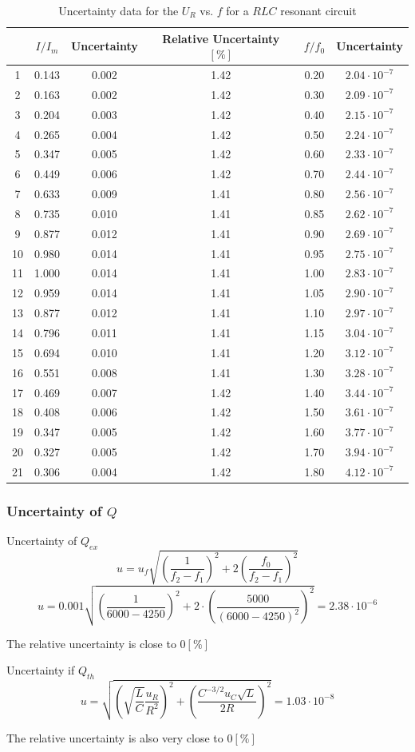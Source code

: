\documentclass[12pt]{article}
\begin{document}
\begin{table}[H]
\centering
\begin{tabular}{|c|c|c|c|c|c|}
\hline
   &$I/I_m$&Uncertainty&Relative Uncertainty $[\%]$&$f/f_0$&Uncertainty       \\ \hline
1  &0.143&0.002&1.42&0.20&$2.04\cdot10^{-7}$       \\ \hline
2  &0.163&0.002&1.42&0.30&$2.09\cdot10^{-7}$       \\ \hline
3  &0.204&0.003&1.42&0.40&$2.15\cdot10^{-7}$       \\ \hline
4  &0.265&0.004&1.42&0.50&$2.24\cdot10^{-7}$       \\ \hline
5  &0.347&0.005&1.42&0.60&$2.33\cdot10^{-7}$       \\ \hline
6  &0.449&0.006&1.42&0.70&$2.44\cdot10^{-7}$       \\ \hline
7  &0.633&0.009&1.41&0.80&$2.56\cdot10^{-7}$       \\ \hline
8  &0.735&0.010&1.41&0.85&$2.62\cdot10^{-7}$       \\ \hline
9  &0.877&0.012&1.41&0.90&$2.69\cdot10^{-7}$       \\ \hline
10 &0.980&0.014&1.41&0.95&$2.75\cdot10^{-7}$       \\ \hline
11 &1.000&0.014&1.41&1.00&$2.83\cdot10^{-7}$       \\ \hline
12 &0.959&0.014&1.41&1.05&$2.90\cdot10^{-7}$       \\ \hline
13 &0.877&0.012&1.41&1.10&$2.97\cdot10^{-7}$       \\ \hline
14 &0.796&0.011&1.41&1.15&$3.04\cdot10^{-7}$       \\ \hline
15 &0.694&0.010&1.41&1.20&$3.12\cdot10^{-7}$       \\ \hline
16 &0.551&0.008&1.41&1.30&$3.28\cdot10^{-7}$       \\ \hline
17 &0.469&0.007&1.42&1.40&$3.44\cdot10^{-7}$       \\ \hline
18 &0.408&0.006&1.42&1.50&$3.61\cdot10^{-7}$       \\ \hline
19 &0.347&0.005&1.42&1.60&$3.77\cdot10^{-7}$       \\ \hline
20 &0.327&0.005&1.42&1.70&$3.94\cdot10^{-7}$       \\ \hline
21 &0.306&0.004&1.42&1.80&$4.12\cdot10^{-7}$       \\ \hline
\end{tabular}
\caption{Uncertainty data for the $U_R$ vs. $f$ for a $RLC$ resonant circuit}
\end{table}
\subsubsection{Uncertainty of $Q$}
\par Uncertainty of $Q_{ex}$
$$u=u_f\sqrt{(\frac{1}{f_2-f_1})^2+2(\frac{f_0}{f_2-f_1})^2}$$
$$u=0.001\sqrt{(\frac{1}{6000-4250})^2+2\cdot(\frac{5000}{(6000-4250)^2})^2}=2.38\cdot10^{-6}$$
\par The relative uncertainty is close to $0[\%]$
\par Uncertainty if $Q_{th}$
$$u=\sqrt{(\sqrt{\frac{L}{C}}\frac{u_R}{R^2})^2+(\frac{C^{-3/2}u_C\sqrt{L}}{2R})^2}=1.03\cdot10^{-8}$$
\par The relative uncertainty is also very close to $0[\%]$
\end{document}
